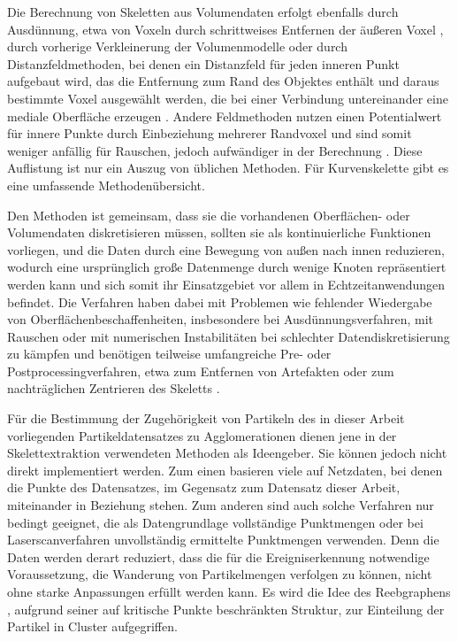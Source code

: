Die Berechnung von Skeletten aus Volumendaten erfolgt ebenfalls durch Ausdünnung, etwa von Voxeln durch schrittweises Entfernen der äußeren Voxel \cite{ma2002TopologyPreservingReduction}, durch vorherige Verkleinerung der Volumenmodelle \cite{wang2008curveSkeletonExtraction} oder durch Distanzfeldmethoden, bei denen ein Distanzfeld für jeden inneren Punkt aufgebaut wird, das die Entfernung zum Rand des Objektes enthält und daraus bestimmte Voxel ausgewählt werden, die bei einer Verbindung untereinander eine mediale Oberfläche erzeugen \cite{hassouna2005robustCenterlineExtraction}. Andere Feldmethoden nutzen einen Potentialwert für innere Punkte durch Einbeziehung mehrerer Randvoxel und sind somit weniger anfällig für Rauschen, jedoch aufwändiger in der Berechnung \cite{cornea2005hierarchicalCurveSkeletons}. Diese Auflistung ist nur ein Auszug von üblichen Methoden. Für Kurvenskelette \cite{cornea2007curveSkeletonProperties} gibt es eine umfassende Methodenübersicht.

Den Methoden ist gemeinsam, dass sie die vorhandenen Oberflächen- oder Volumendaten diskretisieren müssen, sollten sie als kontinuierliche Funktionen vorliegen, und die Daten durch eine Bewegung von außen nach innen reduzieren, wodurch eine ursprünglich große Datenmenge durch wenige Knoten repräsentiert werden kann und sich somit ihr Einsatzgebiet vor allem in Echtzeitanwendungen befindet. Die Verfahren haben dabei mit Problemen wie fehlender Wiedergabe von Oberflächenbeschaffenheiten, insbesondere bei Ausdünnungsverfahren, mit Rauschen oder mit numerischen Instabilitäten bei schlechter Datendiskretisierung zu kämpfen und benötigen teilweise umfangreiche Pre- oder Postprocessingverfahren, etwa zum Entfernen von Artefakten oder zum nachträglichen Zentrieren des Skeletts \cite{cornea2007curveSkeletonProperties}.


Für die Bestimmung der Zugehörigkeit von Partikeln des in dieser Arbeit vorliegenden Partikeldatensatzes zu Agglomerationen dienen jene in der Skelettextraktion verwendeten Methoden als Ideengeber. Sie können jedoch nicht direkt implementiert werden. Zum einen basieren viele auf Netzdaten, bei denen die Punkte des Datensatzes, im Gegensatz zum Datensatz dieser Arbeit, miteinander in Beziehung stehen. Zum anderen sind auch solche Verfahren nur bedingt geeignet, die als Datengrundlage vollständige Punktmengen \cite{wang2008curveSkeletonExtraction} \cite{sharf2007onTheFlyCurveSkeleton} oder bei Laserscanverfahren unvollständig ermittelte Punktmengen \cite{tagliasacchi2009curveIncompletePointCloud} verwenden. Denn die Daten werden derart reduziert, dass die für die Ereigniserkennung notwendige Voraussetzung, die Wanderung von Partikelmengen verfolgen zu können, nicht ohne starke Anpassungen erfüllt werden kann. Es wird die Idee des Reebgraphens \cite{pascucci2007computationReebGraph}, aufgrund seiner auf kritische Punkte beschränkten Struktur, zur Einteilung der Partikel in Cluster aufgegriffen.

